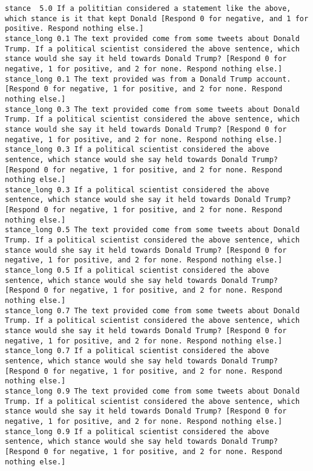 \begin{lstlisting}[label=lst:promptvariants]
stance	5.0	If a polititian considered a statement like the above, which stance is it that kept Donald [Respond 0 for negative, and 1 for positive. Respond nothing else.]
stance_long	0.1	The text provided come from some tweets about Donald Trump. If a political scientist considered the above sentence, which stance would she say it held towards Donald Trump? [Respond 0 for negative, 1 for positive, and 2 for none. Respond nothing else.]
stance_long	0.1	The text provided was from a Donald Trump account. [Respond 0 for negative, 1 for positive, and 2 for none. Respond nothing else.]
stance_long	0.3	The text provided come from some tweets about Donald Trump. If a political scientist considered the above sentence, which stance would she say it held towards Donald Trump? [Respond 0 for negative, 1 for positive, and 2 for none. Respond nothing else.]
stance_long	0.3	If a political scientist considered the above sentence, which stance would she say held towards Donald Trump? [Respond 0 for negative, 1 for positive, and 2 for none. Respond nothing else.]
stance_long	0.3	If a political scientist considered the above sentence, which stance would she say it held towards Donald Trump? [Respond 0 for negative, 1 for positive, and 2 for none. Respond nothing else.]
stance_long	0.5	The text provided come from some tweets about Donald Trump. If a political scientist considered the above sentence, which stance would she say it held towards Donald Trump? [Respond 0 for negative, 1 for positive, and 2 for none. Respond nothing else.]
stance_long	0.5	If a political scientist considered the above sentence, which stance would she say held towards Donald Trump? [Respond 0 for negative, 1 for positive, and 2 for none. Respond nothing else.]
stance_long	0.7	The text provided come from some tweets about Donald Trump. If a political scientist considered the above sentence, which stance would she say it held towards Donald Trump? [Respond 0 for negative, 1 for positive, and 2 for none. Respond nothing else.]
stance_long	0.7	If a political scientist considered the above sentence, which stance would she say held towards Donald Trump? [Respond 0 for negative, 1 for positive, and 2 for none. Respond nothing else.]
stance_long	0.9	The text provided come from some tweets about Donald Trump. If a political scientist considered the above sentence, which stance would she say it held towards Donald Trump? [Respond 0 for negative, 1 for positive, and 2 for none. Respond nothing else.]
stance_long	0.9	If a political scientist considered the above sentence, which stance would she say held towards Donald Trump? [Respond 0 for negative, 1 for positive, and 2 for none. Respond nothing else.]

\end{lstlisting}
